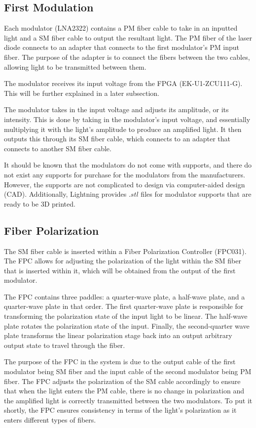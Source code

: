 \documentclass[11pt]{article}
\begin{document}
\subsection{First Modulation}

Each modulator (LNA2322) contains a PM fiber cable to take in an inputted light and a SM fiber cable to output the resultant light. The PM fiber of the laser diode connects to an adapter that connects to the first modulator's PM input fiber. The purpose of the adapter is to connect the fibers between the two cables, allowing light to be transmitted between them.

The modulator receives its input voltage from the FPGA (EK-U1-ZCU111-G). This will be further explained in a later subsection.

The modulator takes in the input voltage and adjusts its amplitude, or its intensity. This is done by taking in the modulator's input voltage, and essentially multiplying it with the light's amplitude to produce an amplified light. It then outputs this through its SM fiber cable, which connects to an adapter that connects to another SM fiber cable. 

It should be known that the modulators do not come with supports, and there do not exist any supports for purchase for the modulators from the manufacturers. However, the supports are not complicated to design via computer-aided design (CAD). Additionally, Lightning provides $.stl$ files for modulator supports that are ready to be 3D printed.

\subsection{Fiber Polarization}

The SM fiber cable is inserted within a Fiber Polarization Controller (FPC031). The FPC allows for adjusting the polarization of the light within the SM fiber that is inserted within it, which will be obtained from the output of the first modulator. 

The FPC contains three paddles: a quarter-wave plate, a half-wave plate, and a quarter-wave plate in that order. The first quarter-wave plate is responsible for transforming the polarization state of the input light to be linear. The half-wave plate rotates the polarization state of the input. Finally, the second-quarter wave plate transforms the linear polarization stage back into an output arbitrary output state to travel through the fiber. 

The purpose of the FPC in the system is due to the output cable of the first modulator being SM fiber and the input cable of the second modulator being PM fiber. The FPC adjusts the polarization of the SM cable accordingly to ensure that when the light enters the PM cable, there is no change in polarization and the amplified light is correctly transmitted between the two modulators. To put it shortly, the FPC ensures consistency in terms of the light's polarization as it enters different types of fibers.
\end{document}
